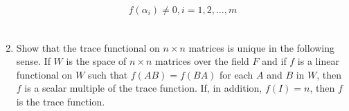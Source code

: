 \begin{enumerate}[label=\thesubsection.\arabic*.,ref=\thesubsection.\theenumi]
\begin{align}
    f(\alpha_i) \neq 0, i=1,2,\hdots,m
\end{align}
%
\\
\solution

\item Show that the trace functional on $n\times n$ matrices is unique in the following sense. If $W$ is the space of $n \times n$ matrices over the field $F$ and if $f$ is a linear functional on $W$ such that $f(AB) = f(BA)$ for each $A$ and $B$ in $W$, then $f$ is a scalar multiple of the trace function. If, in addition, $f(I)=n$, then $f$ is the trace function.
\\
\solution

\end{enumerate}

